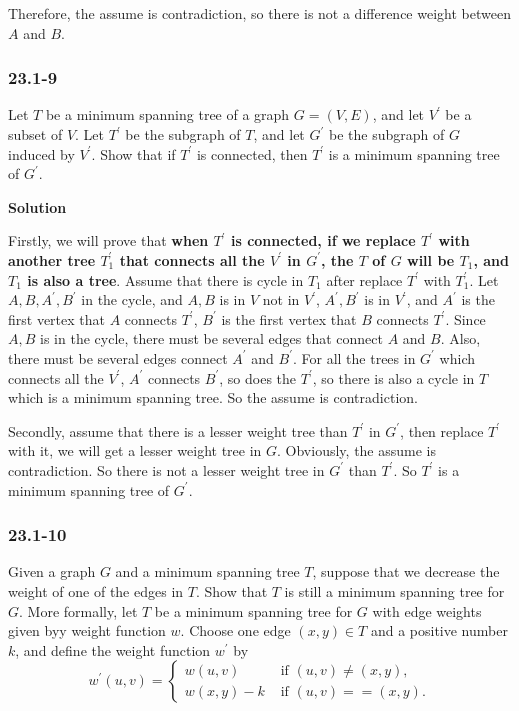 Therefore, the assume is contradiction, so there is not a difference weight
between $A$ and $B$.

\subsubsection{23.1-9}

Let $T$ be a minimum spanning tree of a  graph $G = (V, E)$, and let $V^{'}$ be
a subset of $V$. Let $T^{'}$ be the subgraph of $T$, and let $G^{'}$ be the
subgraph of $G$ induced by $V^{'}$. Show that if $T^{'}$ is connected, then
$T^{'}$ is a minimum spanning tree of $G^{'}$.

\textbf{Solution}

Firstly, we will prove that \textbf{when $T^{'}$ is connected, if we replace
$T^{'}$ with another tree $T^{'}_1$ that connects all the $V^{'}$ in $G^{'}$,
the $T$ of $G$ will be $T_1$, and $T_1$ is also a tree}. Assume that there is
cycle in $T_1$ after replace $T^{'}$ with $T^{'}_1$. Let $A, B, A^{'}, B^{'}$
in the cycle, and $A, B$ is in $V$ not in $V^{'}$, $A^{'}, B^{'}$ is in $V^{'}$,
and $A^{'}$ is the first vertex that $A$ connects $T^{'}$, $B^{'}$ is the first
vertex that $B$ connects $T^{'}$. Since $A, B$ is in the cycle, there must be
several edges that connect $A$ and $B$. Also, there must be several edges
connect $A^{'}$ and $B^{'}$. For all the trees in $G^{'}$ which connects all the
$V^{'}$, $A^{'}$ connects $B^{'}$, so does the $T^{'}$, so there is also a
cycle in $T$ which is a minimum spanning tree. So the assume is contradiction. 

Secondly, assume that there is a lesser weight tree than $T^{'}$ in $G^{'}$,
then replace $T^{'}$ with it, we will get a lesser weight tree in $G$.
Obviously, the assume is contradiction. So there is not a lesser weight tree in
$G^{'}$ than $T^{'}$. So $T^{'}$ is a minimum spanning tree of $G^{'}$.


\subsubsection{23.1-10}

Given a graph $G$ and a minimum spanning tree $T$, suppose that we decrease the
weight of one of the edges in $T$. Show that $T$ is still a minimum spanning
tree for $G$. More formally, let $T$ be a minimum spanning tree for $G$ with
edge weights given byy weight function $w$. Choose one edge $(x, y) \in T$ and a
positive number $k$, and define the weight function $w^{'}$ by
$$
w^{'}(u, v) = \left\{ \begin{array}{rl}
 w(u, v) &\mbox{ if $(u, v) \neq (x, y)$,} \\
 w(x, y) - k &\mbox{ if $(u, v) == (x, y)$.}
       \end{array} \right.
$$

